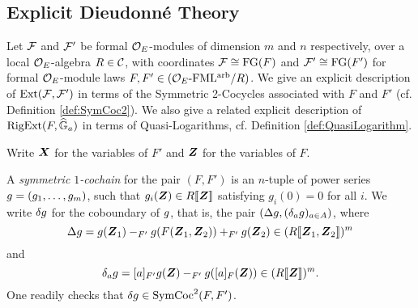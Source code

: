 \documentclass[../main.tex]{subfiles}
\begin{document}

\subsection{Explicit Dieudonné Theory} %
\label{sub:Explicit Dieudonne Theory}
Let $\mathcal{F}$ and $\mathcal{F}'$ be formal $\mathcal{O}_E$-modules of dimension $m$ and $n$ respectively,
over a local $\mathcal{O}_E$-algebra $R \in \mathcal{C}$, with coordinates 
$\mathcal{F} \cong \textnormal{FG}(F)$ and $\mathcal{F}' \cong \textnormal{FG}(F')$ for formal $\mathcal{O}_E$-module laws
$F, F' \in {({\mathcal{O}_E}\textnormal-\allowbreak\mathrm{FML^{arb}}/{R})}$. We give an explicit description of $\operatorname{Ext}(\mathcal{F},
\mathcal{F}')$ in terms of the Symmetric 2-Cocycles associated with $F$ and
$F'$ (cf. Definition \ref{def:SymCoc2}). We also give a related explicit
description of $\operatorname {RigExt}(F, \widehat{\mathbb{G}}_a)$ in terms of Quasi-Logarithms, cf.
Definition \ref{def:QuasiLogarithm}. 

Write $\boldsymbol{X}$ for the variables of $F'$ and $\boldsymbol{Z}$ for the variables of $F$.
\begin{defi} \label{def:SymCoc1}
  A \emph{symmetric $1$-cochain} for the pair $(F,F')$ is an $n$-tuple of power 
  series ${g} = (g_1, \dots, g_m)$, such that $g_i(\boldsymbol{Z}) \in R\llbracket \boldsymbol{Z} \rrbracket$
  satisfying $g_i(0) = 0$ for all $i$. We write $\delta {g}$ 
  for the coboundary of ${g}$, that is, the pair $(\Delta {g}, (\delta_a
  {g})_{a \in A})$,
  where
  \begin{equation*}
    \Delta {g} = {g}(\boldsymbol{Z}_1) -_{F'} {g}(F(\boldsymbol{Z}_1,\boldsymbol{Z}_2)) +_{F'} {g}(\boldsymbol{Z}_2)
    \in (R\llbracket \boldsymbol{Z}_1, \boldsymbol{Z}_2 \rrbracket)^m
  \end{equation*}
  and 
  \begin{equation*}
    \delta_a {g} = [a]_{F'} {g}(\boldsymbol{Z}) -_{F'} {g}([a]_F(\boldsymbol{Z})) \in (R \llbracket \boldsymbol{Z}
    \rrbracket)^m.
  \end{equation*}
  One readily checks that $\delta {g} \in \operatorname{SymCoc}^2(F, F')$. 
\end{defi}
\end{document}
